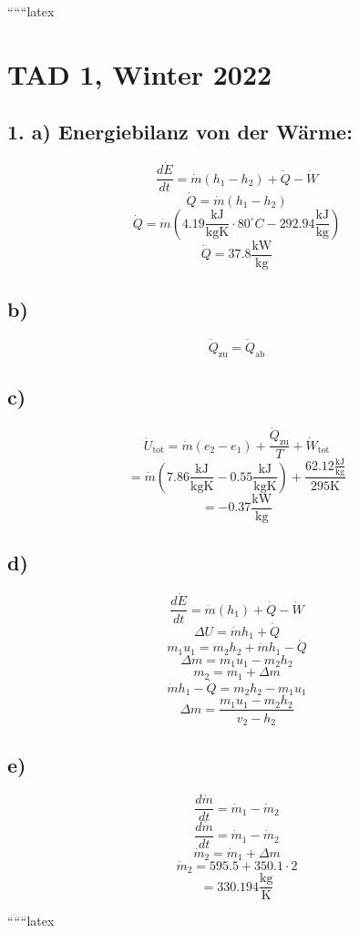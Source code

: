 
``````latex


\section*{TAD 1, Winter 2022}

\subsection*{1. a) Energiebilanz von der Wärme:}
\[
\frac{d\dot{E}}{dt} = \dot{m}(h_1 - h_2) + \dot{Q} - \dot{W}
\]
\[
\dot{Q} = \dot{m}(h_1 - h_2)
\]
\[
\dot{Q} = \dot{m} \left( 4.19 \frac{\text{kJ}}{\text{kgK}} \cdot 80^\circ C - 292.94 \frac{\text{kJ}}{\text{kg}} \right)
\]
\[
\dot{Q} = 37.8 \frac{\text{kW}}{\text{kg}}
\]

\subsection*{b)}
\[
\dot{Q}_{\text{zu}} = \dot{Q}_{\text{ab}}
\]

\subsection*{c)}
\[
\dot{U}_{\text{tot}} = \dot{m}(e_2 - e_1) + \frac{\dot{Q}_{\text{zu}}}{T} + \dot{W}_{\text{tot}}
\]
\[
= \dot{m} \left( 7.86 \frac{\text{kJ}}{\text{kgK}} - 0.55 \frac{\text{kJ}}{\text{kgK}} \right) + \frac{62.12 \frac{\text{kJ}}{\text{kg}}}{295 \text{K}}
\]
\[
= -0.37 \frac{\text{kW}}{\text{kg}}
\]

\subsection*{d)}
\[
\frac{d\dot{E}}{dt} = \dot{m}(h_1) + \dot{Q} - \dot{W}
\]
\[
\Delta U = \dot{m} h_1 + \dot{Q}
\]
\[
m_1 u_1 = m_2 h_2 + \dot{m} h_1 - \dot{Q}
\]
\[
\Delta m = m_1 u_1 - m_2 h_2
\]
\[
m_2 = m_1 + \Delta m
\]
\[
\dot{m} h_1 - \dot{Q} = m_2 h_2 - m_1 u_1
\]
\[
\Delta m = \frac{m_1 u_1 - m_2 h_2}{v_2 - h_2}
\]

\subsection*{e)}
\[
\frac{d\dot{m}}{dt} = \dot{m}_1 - \dot{m}_2
\]
\[
\frac{d\dot{m}}{dt} = \dot{m}_1 - \dot{m}_2
\]
\[
\dot{m}_2 = \dot{m}_1 + \Delta m
\]
\[
\dot{m}_2 = 595.5 + 350.1 \cdot 2
\]
\[
= 330.194 \frac{\text{kg}}{\text{K}}
\]

``````latex


